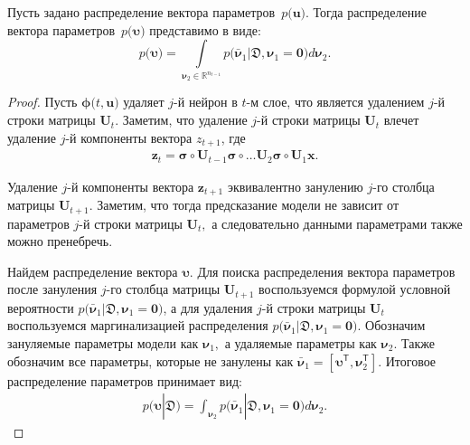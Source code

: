 \begin{theorem}
Пусть задано распределение вектора параметров~$p\bigr(\mathbf{u}\bigr).$ Тогда распределение вектора параметров~$p\bigr(\bm{\upsilon}\bigr)$ представимо в виде:
\[
p\bigr(\bm{\upsilon}\bigr)  = \int\limits_{ \bm{\nu}_2 \in \mathbb{R}^{n_{t-1}}}p\bigr(\bar{\bm{\nu}}_1|\mathfrak{D}, \bm{\nu}_1=\mathbf{0}\bigr) d \bm{\nu}_2.
\]
\end{theorem}
\begin{proof}
Пусть $\bm{\phi}\bigr(t, \mathbf{u}\bigr)$ удаляет $j$-й нейрон в $t$-м слое, что является удалением $j$-й строки матрицы $\mathbf{U}_t$. Заметим, что удаление $j$-й строки матрицы $\mathbf{U}_t$ влечет удаление $j$-й компоненты вектора $z_{t+1}$, где
\[
\label{ch:3:eq:ap:tr:neural:1}
\begin{aligned}
\mathbf{z}_{t} = \bm{\sigma} \circ \mathbf{U}_{t-1} \bm{\sigma} \circ \ldots  \mathbf{U}_2\bm{\sigma} \circ \mathbf{U}_1\mathbf{x}.
\end{aligned}
\]

Удаление $j$-й компоненты вектора $\mathbf{z}_{t+1}$ эквивалентно занулению $j$-го столбца матрицы $\mathbf{U}_{t+1}.$ Заметим, что тогда предсказание модели не зависит от параметров $j$-й строки матрицы $\mathbf{U}_t,$ а следовательно данными параметрами также можно пренебречь.

Найдем распределение вектора $\bm{\upsilon}.$ Для поиска распределения вектора параметров после зануления $j$-го столбца матрицы $\mathbf{U}_{t+1}$ воспользуемся формулой условной вероятности $p\bigr(\bar{\bm{\nu}}_1|\mathfrak{D}, \bm{\nu}_1=\mathbf{0}\bigr)$, а для удаления $j$-й строки матрицы $\mathbf{U}_{t}$ воспользуемся маргинализацией распределения $p\bigr(\bar{\bm{\nu}}_1|\mathfrak{D}, \bm{\nu}_1=\mathbf{0}\bigr)$. Обозначим зануляемые параметры модели как $\bm{\nu}_1,$ а удаляемые параметры как $\bm{\nu}_2.$ Также обозначим все параметры, которые не занулены как $\bar{\bm{\nu}}_1 = [\bm{\upsilon}^{\mathsf{T}}, \bm{\nu}_2^{\mathsf{T}}].$ Итоговое распределение параметров принимает  вид:
\[
\label{ch:3:eq:ap:tr:1:1}
\begin{aligned}
p\bigr(\bm{\upsilon}|\mathfrak{D}\bigr)  = \int_{\bm{\nu}_2}p\bigr(\bar{\bm{\nu}}_1|\mathfrak{D}, \bm{\nu}_1=\mathbf{0}\bigr) d\bm{\nu}_2.
\end{aligned}
\]
\end{proof}

